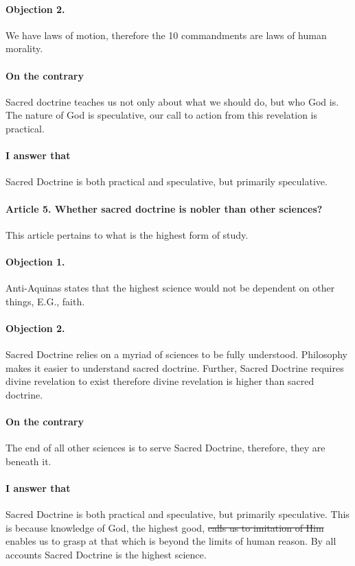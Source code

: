 \documentclass{ucetd}
\begin{document}
\paragraph{Objection 2.}
We have laws of motion, therefore the 10 commandments are laws of human morality.
\paragraph{On the contrary}
Sacred doctrine teaches us not only about what we should do, but who God is. The nature of God is speculative, our call to action from this revelation is practical.
\paragraph{I answer that}
Sacred Doctrine is both practical and speculative, but primarily speculative.
 
\paragraph{Article 5. Whether sacred doctrine is nobler than other sciences?}
This article pertains to what is the highest form of study.
\paragraph{Objection 1.}
Anti-Aquinas states that the highest science would not be dependent on other things, E.G., faith.
\paragraph{Objection 2.}
Sacred Doctrine relies on a myriad of sciences to be fully understood. Philosophy makes it easier to understand sacred doctrine. Further, Sacred Doctrine requires divine revelation to exist therefore divine revelation is higher than sacred doctrine.
\paragraph{On the contrary}
The end of all other sciences is to serve Sacred Doctrine, therefore, they are beneath it.
\paragraph{I answer that}
Sacred Doctrine is both practical and speculative, but primarily speculative. This is because knowledge of God, the highest good, \sout{calls us to imitation of Him} enables us to grasp at that which is beyond the limits of human reason. By all accounts Sacred Doctrine is the highest science.
  
\end{document}
